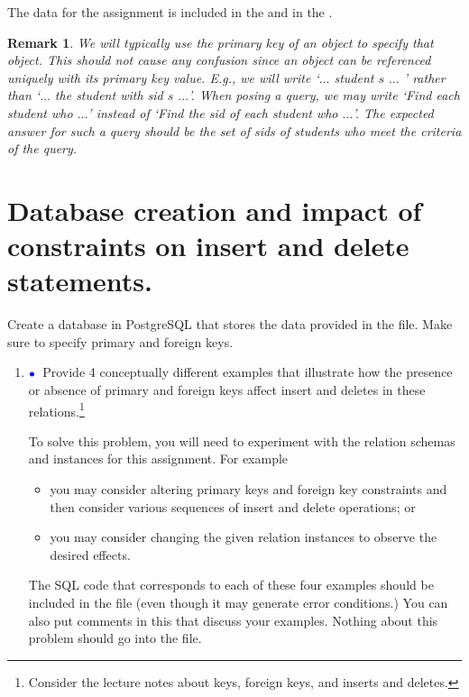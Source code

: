 \documentclass{article}
\newcommand{\blue}[1]{{\color{blue}#1}}
\newcommand{\bluebullet}{$\blue{\bullet}$}
\newtheorem{remark}{Remark}
\begin{document}
The data for the assignment is included in the \blue{{\tt Assignment1Script.sql}}
and 
in the \blue{{\tt Assignment1Script.py}}.

\begin{remark}
We will typically use the primary key of an object to specify that object.
This should not cause any confusion since an object can be referenced uniquely with its primary key value.
E.g., we will write `\emph{$\ldots$ student $s$ $\ldots$ }' rather than `\emph{$\ldots$ the student with sid $s$ $\ldots$}'.   When posing a query, we may write `\emph{Find each student who $\ldots$}' instead of 
`\emph{Find the sid of each student who $\ldots$}'.   The expected answer for such a query should be the set of sids of students who meet the criteria of the query. 
\end{remark}



\newpage
\section{Database creation and impact of constraints on insert and delete statements.}

Create a database in PostgreSQL that stores the data provided in the \blue{{\tt Assignment1Script.sql}}
file.
Make sure to specify primary and foreign keys.

\begin{enumerate}
\item \bluebullet\ Provide 4 conceptually different examples that illustrate how the presence or absence of primary and
  foreign keys affect insert and deletes in these relations.\footnote{Consider the lecture notes about keys, foreign keys, and inserts and deletes.}
  
  To solve this problem,
  you will need to experiment with the  relation schemas and instances for this assignment.   
  For example
  
 \begin{itemize}
  \item you may consider altering primary keys and foreign key constraints and
  then consider various sequences of insert and delete operations; or
  \item you may consider changing the given
  relation instances to observe the desired effects.
 \end{itemize}

  
  The SQL code that corresponds  to each of these four examples should be included in the \blue{{\tt assignment1.sql}} file (even though it may generate error conditions.)   You can also put comments in this that discuss your examples.   Nothing about this problem should go into the \blue{{\tt assignment1.pdf}} file. 
  
  
  \end{enumerate}
 \newpage
\end{document}
